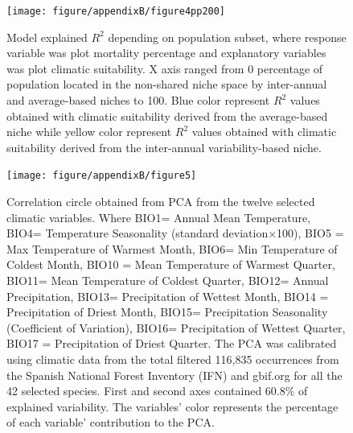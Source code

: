 \documentclass[11pt,twoside]{reedthesis}
\begin{document}
\begin{figure}[hbt!]

{\centering \texttt{[image: figure/appendixB/figure4pp200]} 

}

\caption[Model explained $R^2$ depending on population subset]{Model explained $R^2$ depending on population subset, where response variable was plot mortality percentage and explanatory variables was plot climatic suitability. X axis ranged from 0 percentage of population located in the non-shared niche space by inter-annual and average-based niches to 100. Blue color represent $R^2$ values obtained with climatic suitability derived from the average-based niche while yellow color represent $R^2$ values obtained with climatic suitability derived from the inter-annual variability-based niche.}\label{fig:apc4}
\end{figure}\newpage
\begin{figure}[hbt!]

{\centering \texttt{[image: figure/appendixB/figure5]} 

}

\caption[Correlation circle obtained from PCA calibrated with occurrences of multiples mediterranean species]{Correlation circle obtained from PCA from the twelve selected climatic variables. Where BIO1= Annual Mean Temperature, BIO4= Temperature Seasonality (standard deviation×100), BIO5 = Max Temperature of Warmest Month, BIO6= Min Temperature of Coldest Month, BIO10 = Mean Temperature of Warmest Quarter, BIO11= Mean Temperature of Coldest Quarter, BIO12= Annual Precipitation, BIO13= Precipitation of Wettest Month, BIO14 = Precipitation of Driest Month, BIO15= Precipitation Seasonality (Coefficient of Variation), BIO16= Precipitation of Wettest Quarter, BIO17 = Precipitation of Driest Quarter. The PCA was calibrated using climatic data from the total filtered 116,835 occurrences from the Spanish National Forest Inventory (IFN) and gbif.org for all the 42 selected species.  First and second axes contained 60.8\% of explained variability. The variables' color represents the percentage of each variable' contribution to the PCA.}\label{fig:apc5}
\end{figure}\newpage
\begingroup\fontsize{7}{9}\selectfont
\end{document}

